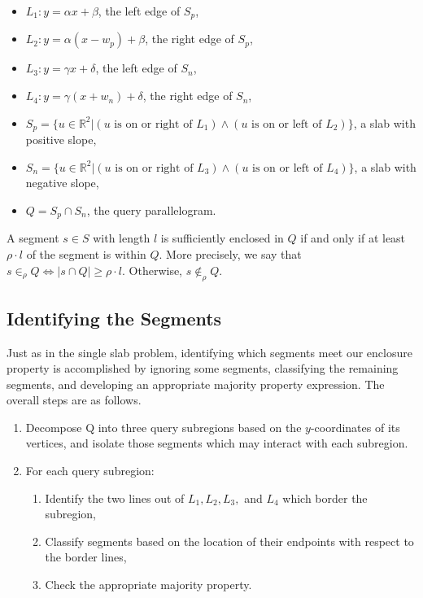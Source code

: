 \begin{itemize}
 \item $L_1 : y = \alpha x + \beta$, the left edge of $S_p$,

 \item $L_2 : y = \alpha (x - w_p) + \beta$, the right edge of $S_p$,

 \item $L_3 : y = \gamma x + \delta$, the left edge of $S_n$,

 \item $L_4 : y = \gamma (x + w_n) + \delta$, the right edge of $S_n$,

 \item $S_p = \{ u \in \mathbb{R}^2 | (u \text{ is on or right of } L_1) \wedge (u \text{ is on or left of } L_2) \}$, a slab with positive slope,

 \item $S_n = \{ u \in \mathbb{R}^2 | (u \text{ is on or right of } L_3) \wedge (u \text{ is on or left of } L_4) \}$, a slab with negative slope,

 \item $Q = S_p \cap S_n$, the query parallelogram.

\end{itemize}

A segment $s \in S$ with length $l$ is sufficiently enclosed in $Q$ if and only if at least $\rho \cdot l$ of the segment is within $Q$. More precisely, we say that $s \in_\rho Q \Leftrightarrow |s \cap Q| \geq \rho \cdot l$. Otherwise, $s \not \in_\rho Q$.


\subsection{Identifying the Segments}
\label{:slabs:two:approach}

Just as in the single slab problem, identifying which segments meet our enclosure property is accomplished by ignoring some segments, classifying the remaining segments, and developing an appropriate majority property expression.
The overall steps are as follows.

\begin{enumerate}
 \item Decompose Q into three query subregions based on the $y$-coordinates of its vertices, and isolate those segments which may interact with each subregion.

 \item For each query subregion:
 \begin{enumerate}
  \item Identify the two lines out of $L_1, L_2, L_3,$ and $L_4$ which border the subregion,
  \item Classify segments based on the location of their endpoints with respect to the border lines,
  \item Check the appropriate majority property.
 \end{enumerate}
\end{enumerate}

